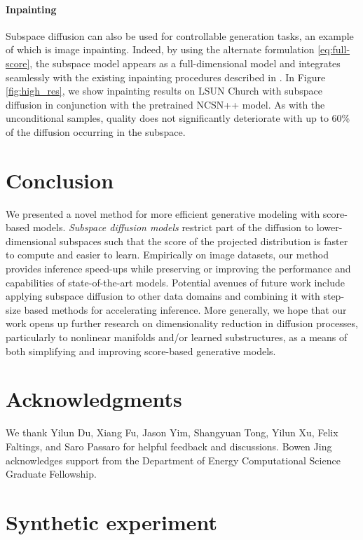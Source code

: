 \documentclass{article}
\begin{document}
\paragraph{\textbf{Inpainting}} Subspace diffusion can also be used for controllable generation tasks, an example of which is image inpainting. Indeed, by using the alternate formulation \eqref{eq:full-score}, the subspace model appears as a full-dimensional model and integrates seamlessly with the existing inpainting procedures described in \cite{song2021score}. In Figure \ref{fig:high_res}, we show inpainting results on LSUN Church with  subspace diffusion in conjunction with the pretrained NCSN++ model. As with the unconditional samples, quality does not significantly deteriorate with up to 60\% of the diffusion occurring in the subspace.

\section{Conclusion}
We presented a novel method for more efficient generative modeling with score-based models. \textit{Subspace diffusion models} restrict part of the diffusion to lower-dimensional subspaces such that the score of the projected distribution is faster to compute and easier to learn. Empirically on image datasets, our method provides inference speed-ups while preserving or improving the performance and capabilities of  state-of-the-art models. Potential avenues of future work include applying subspace diffusion to other data domains and combining it with step-size based methods for accelerating inference. More generally, we hope that our work opens up further research on dimensionality reduction in diffusion processes, particularly to nonlinear manifolds and/or learned substructures, as a means of both simplifying and improving score-based generative models.

\section*{Acknowledgments}
We thank Yilun Du, Xiang Fu, Jason Yim, Shangyuan Tong, Yilun Xu, Felix Faltings, and Saro Passaro for helpful feedback and discussions. Bowen Jing acknowledges support from the Department of Energy Computational Science Graduate Fellowship.



\clearpage
\appendix
\section{Synthetic experiment}\label{app:synthetic}
\end{document}
